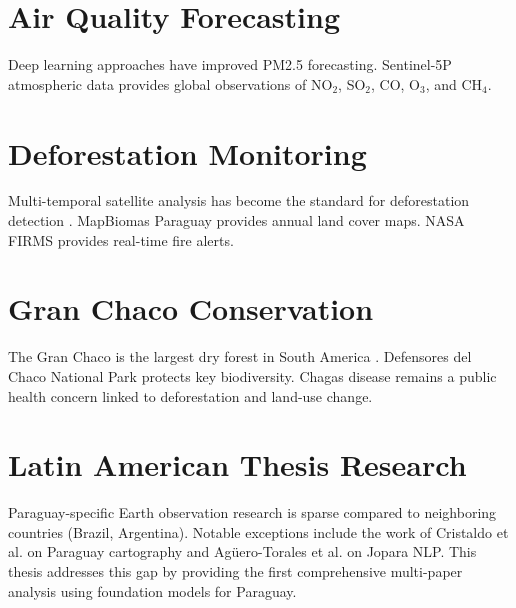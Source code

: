 \section{Air Quality Forecasting}

Deep learning approaches \citep{openaq2024} have improved PM2.5 forecasting.
Sentinel-5P atmospheric data \citep{esacopernicus2024} provides global
observations of NO$_2$, SO$_2$, CO, O$_3$, and CH$_4$.

\section{Deforestation Monitoring}

Multi-temporal satellite analysis has become the standard for deforestation
detection \citep{hansen2013high}. MapBiomas Paraguay
\citep{mapbiomas2024paraguay} provides annual land cover maps. NASA FIRMS
\citep{nasafirms2024} provides real-time fire alerts.

\section{Gran Chaco Conservation}

The Gran Chaco is the largest dry forest in South America
\citep{rivas2026gran_chaco}. Defensores del Chaco National Park
\citep{defensores2024} protects key biodiversity. Chagas disease
\citep{who2022chagas, sandon2025chagas} remains a public health concern
linked to deforestation and land-use change.

\section{Latin American Thesis Research}

Paraguay-specific Earth observation research is sparse compared to
neighboring countries (Brazil, Argentina). Notable exceptions include
the work of Cristaldo et al. on Paraguay
cartography and Agüero-Torales et al. \citep{aguerotorales2023jopara} on
Jopara NLP. This thesis addresses this gap by providing the first
comprehensive multi-paper analysis using foundation models for Paraguay.
